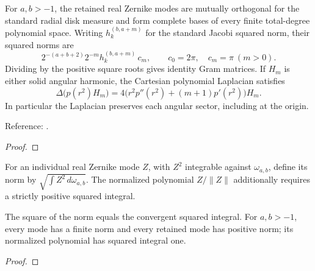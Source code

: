\begin{theorem}
\label{thm:zernike-polynomials}
\leanok
For $a,b>-1$, the retained real Zernike modes are mutually orthogonal for the
standard radial disk measure and form complete bases of every finite total-degree
polynomial space. Writing $h_k^{(b,a+m)}$ for the standard Jacobi squared norm,
their squared norms are
\[
 2^{-(a+b+2)}2^{-m}h_k^{(b,a+m)}\,c_m,
 \qquad c_0=2\pi,\quad c_m=\pi\ (m>0).
\]
Dividing by the positive square roots gives identity Gram matrices. If $H_m$
is either solid angular harmonic, the Cartesian polynomial Laplacian satisfies
\[
 \Delta\bigl(p(r^2)H_m\bigr)
 =4\bigl(r^2p''(r^2)+(m+1)p'(r^2)\bigr)H_m.
\]
In particular the Laplacian preserves each angular sector, including at the origin.

Reference: \cite[18.37(i)]{dlmf}.
\end{theorem}
\begin{proof}
\leanok
\end{proof}

\begin{supporting}
\begin{definition}
\label{def:zernike-mode-normalization}
\leanok
For an individual real Zernike mode $Z$, with $Z^2$ integrable against $\omega_{a,b}$, define its norm by $\sqrt{\int Z^2\,d\omega_{a,b}}$.
The normalized polynomial $Z/\|Z\|$ additionally requires a strictly positive
squared integral.
\end{definition}

\begin{theorem}
\label{thm:zernike-mode-normalization}
\leanok
The square of the norm equals the convergent squared integral.
For $a,b>-1$, every mode has a finite norm and every retained mode has positive
norm; its normalized polynomial has squared integral one.
\end{theorem}
\begin{proof}
\leanok
\end{proof}
\end{supporting}




